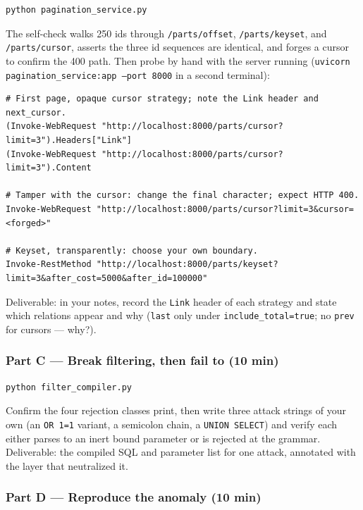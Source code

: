 \begin{verbatim}
python pagination_service.py
\end{verbatim}

The self-check walks 250 ids through \texttt{/parts/offset},
\texttt{/parts/keyset}, and \texttt{/parts/cursor}, asserts the three id
sequences are identical, and forges a cursor to confirm the 400 path. Then
probe by hand with the server running
(\texttt{uvicorn pagination\_service:app --port 8000} in a second terminal):

\begin{verbatim}
# First page, opaque cursor strategy; note the Link header and next_cursor.
(Invoke-WebRequest "http://localhost:8000/parts/cursor?limit=3").Headers["Link"]
(Invoke-WebRequest "http://localhost:8000/parts/cursor?limit=3").Content

# Tamper with the cursor: change the final character; expect HTTP 400.
Invoke-WebRequest "http://localhost:8000/parts/cursor?limit=3&cursor=<forged>"

# Keyset, transparently: choose your own boundary.
Invoke-RestMethod "http://localhost:8000/parts/keyset?limit=3&after_cost=5000&after_id=100000"
\end{verbatim}

Deliverable: in your notes, record the \texttt{Link} header of each
strategy and state which relations appear and why (\texttt{last} only under
\texttt{include\_total=true}; no \texttt{prev} for cursors --- why?).

\subsubsection{Part C --- Break filtering, then fail to (10 min)}

\begin{verbatim}
python filter_compiler.py
\end{verbatim}

Confirm the four rejection classes print, then write three attack strings of
your own (an \texttt{OR 1=1} variant, a semicolon chain, a
\texttt{UNION SELECT}) and verify each either parses to an inert bound
parameter or is rejected at the grammar. Deliverable: the compiled SQL and
parameter list for one attack, annotated with the layer that neutralized it.

\subsubsection{Part D --- Reproduce the anomaly (10 min)}

